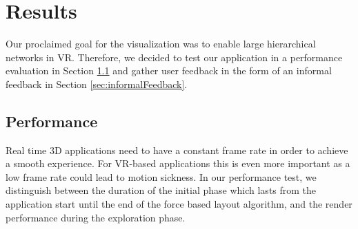 \chapter{Results}

Our proclaimed goal for the visualization was to enable large hierarchical networks in VR. 
Therefore, we decided to test our application in a performance evaluation in Section \ref{sec:performanceEvaluation} and gather user feedback in the form of an informal feedback in Section \ref{sec:informalFeedback}.

\section{Performance}
\label{sec:performanceEvaluation}

Real time 3D applications need to have a constant frame rate in order to achieve a smooth experience.
For VR-based applications this is even more important as a low frame rate could lead to motion sickness. 
In our performance test, we distinguish between the duration of the initial phase which lasts from the application start until the end of the force based layout algorithm, and the render performance during the exploration phase. 

